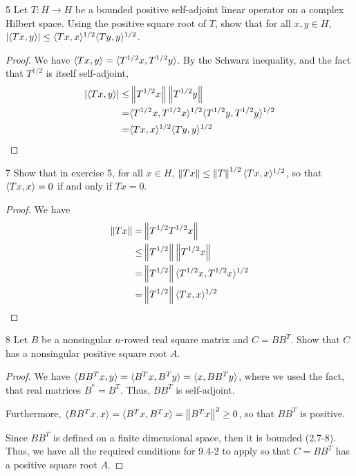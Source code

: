 \begin{exercise}{5}
Let $T: H \to H$ be a bounded positive self-adjoint linear operator on a complex Hilbert space.
Using the positive square root of $T$, show that for all $x, y \in H$, $\left\lvert \langle Tx, y\rangle\right\rvert \leq \langle Tx, x\rangle^{1/2} \langle Ty, y\rangle^{1/2}$.
\end{exercise}
\begin{proof}
We have $\langle Tx, y\rangle = \langle T^{1/2}x, T^{1/2}y\rangle$.
By the Schwarz inequality, and the fact that $T^{1/2}$ is itself self-adjoint,
\begin{align*}
    \left\lvert \langle Tx, y\rangle\right\rvert
    \leq& \left\lVert T^{1/2}x\right\rVert \left\lVert T^{1/2}y\right\rVert\\
    =& \langle T^{1/2}x, T^{1/2}x\rangle^{1/2} \langle T^{1/2}y, T^{1/2}y\rangle^{1/2}\\
    =& \langle Tx, x\rangle^{1/2} \langle Ty, y\rangle^{1/2}
\end{align*}
\end{proof} 

\begin{exercise}{7}
Show that in exercise 5, for all $x \in H$, $\left\lVert Tx\right\rVert \leq \left\lVert T\right\rVert^{1/2} \langle Tx, x\rangle^{1/2}$, so that $\langle Tx, x\rangle = 0$ if and only if $Tx = 0$.
\end{exercise}
\begin{proof}
We have 
\begin{align*}
    \left\lVert Tx\right\rVert
    =& \left\lVert T^{1/2} T^{1/2} x\right\rVert\\
    \leq& \left\lVert T^{1/2}\right\rVert \left\lVert T^{1/2}x\right\rVert\\
    =& \left\lVert T^{1/2}\right\rVert \langle T^{1/2}x, T^{1/2}x\rangle^{1/2}\\
    =& \left\lVert T^{1/2}\right\rVert \langle Tx, x\rangle^{1/2}
\end{align*}
\end{proof} 

\begin{exercise}{8}
Let $B$ be a nonsingular $n$-rowed real square matrix and $C = B B^T$.
Show that $C$ has a nonsingular positive square root $A$.
\end{exercise}
\begin{proof}
We have $\langle B B^T x, y\rangle = \langle B^T x, B^T y\rangle = \langle x, B B^T y\rangle$, where we used the fact, that real matrices $B^\ast = B^T$.
Thus, $B B^T$ is self-adjoint.

Furthermore, $\langle B B^T x, x\rangle = \langle B^T x, B^T x\rangle = \left\lVert B^T x\right\rVert^2 \geq 0$, so that $B B^T$ is positive.

Since $B B^T$ is defined on a finite dimensional space, then it is bounded (2.7-8).
Thus, we have all the required conditions for 9.4-2 to apply so that $C = B B^T$ has a positive square root $A$.
\end{proof} 

